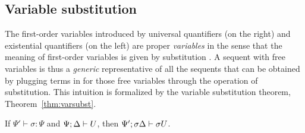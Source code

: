 \subsection{Variable substitution}

The first-order variables introduced by universal quantifiers (on the
right) and existential quantifiers (on the left) are proper {\it
  variables} in the sense that the meaning of first-order variables is
given by substitution \cite[Chapter 1]{harper12practical}. A sequent
with free variables is thus a {\it generic} representative of all the
sequents that can be obtained by plugging terms in for those free
variables through the operation of substitution. This intuition is
formalized by the variable substitution theorem,
Theorem~\ref{thm:varsubst}.

\bigskip
\begin{theorem}
\label{thm:varsubst}
If $\Psi' \vdash \sigma : \Psi$ and ${\Psi};{\Delta} \vdash {U}$, then 
${\Psi'};{\sigma\Delta} \vdash {\sigma{U}}$.
\end{theorem}

